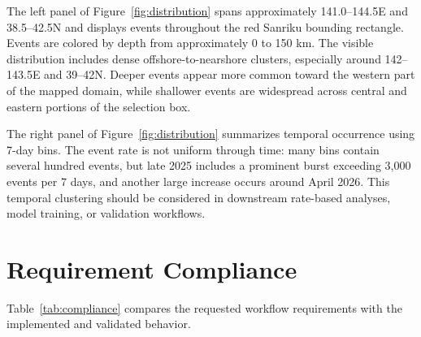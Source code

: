 \documentclass[11pt]{article}
\begin{document}
The left panel of Figure~\ref{fig:distribution} spans approximately 141.0--144.5\textdegree{}E and 38.5--42.5\textdegree{}N and displays events throughout the red Sanriku bounding rectangle. Events are colored by depth from approximately 0 to 150 km. The visible distribution includes dense offshore-to-nearshore clusters, especially around 142--143.5\textdegree{}E and 39--42\textdegree{}N. Deeper events appear more common toward the western part of the mapped domain, while shallower events are widespread across central and eastern portions of the selection box.

The right panel of Figure~\ref{fig:distribution} summarizes temporal occurrence using 7-day bins. The event rate is not uniform through time: many bins contain several hundred events, but late 2025 includes a prominent burst exceeding 3,000 events per 7 days, and another large increase occurs around April 2026. This temporal clustering should be considered in downstream rate-based analyses, model training, or validation workflows.

\section{Requirement Compliance}

Table~\ref{tab:compliance} compares the requested workflow requirements with the implemented and validated behavior.
\end{document}
